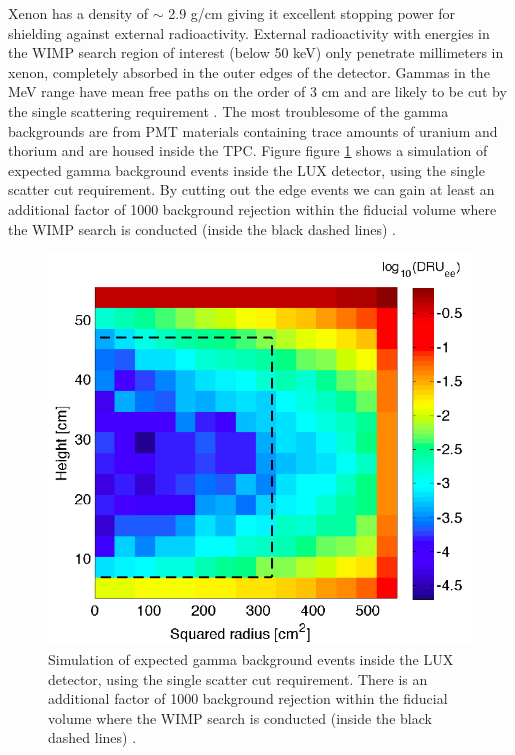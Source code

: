 Xenon has a density of $\sim$ 2.9 g/cm giving it excellent stopping power for shielding against external radioactivity. External radioactivity with energies in the WIMP search region of interest (below 50 keV) only penetrate millimeters in xenon, completely absorbed in the outer edges of the detector. Gammas in the MeV range have mean free paths on the order of 3 cm and are likely to be cut by the single scattering requirement . The most troublesome of the gamma backgrounds are from PMT materials containing trace amounts of uranium and thorium and are housed inside the TPC. Figure figure \ref{fig:LUX_BG_Rejection} shows a simulation of expected gamma background events inside the LUX detector, using the single scatter cut requirement. By cutting out the edge events we can gain at least an additional factor of 1000 background rejection within the fiducial volume where the WIMP search is conducted (inside the black dashed lines) \cite{LUX_BG}.

 \begin{figure}[h!]\centering
\includegraphics[scale=.45]{Chapter_LUX_Det/BG_Rejection.png}
\caption{Simulation of expected gamma background events inside the LUX detector, using the single scatter cut requirement\cite{LUX_BG}. There is an additional factor of 1000 background rejection within the fiducial volume where the WIMP search is conducted (inside the black dashed lines) .}
\label{fig:LUX_BG_Rejection}
\end{figure}

